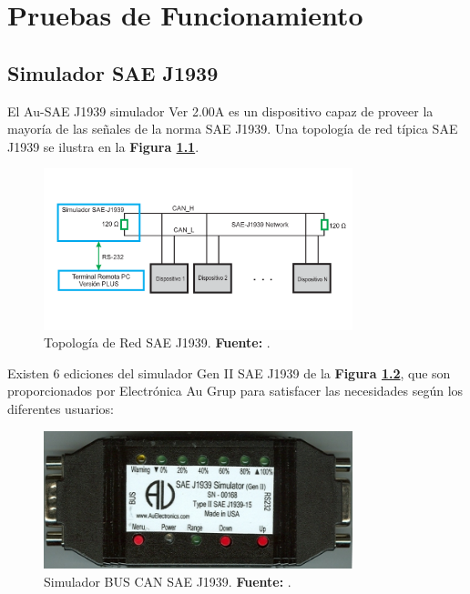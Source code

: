 \chapter[Capítulo 6. Pruebas de Funcionamiento]{Pruebas de Funcionamiento}

\section{Simulador SAE J1939}

El Au-SAE J1939 simulador Ver 2.00A es un dispositivo capaz de proveer la mayoría de las señales de la norma SAE J1939. Una topología de red típica SAE J1939 se ilustra en la \textbf{Figura \ref{TPSAE}}.

\begin{figure}[H]
	\centering
		\includegraphics[width=0.8\textwidth]{./Cap6imagen/EjemploSimulador.pdf}
	\caption[Topología de Red SAE J1939.]{Topología de Red SAE J1939.\textbf{ Fuente:} \cite{UserM}.}
	\label{TPSAE} %
\end{figure}

Existen 6 ediciones del simulador  Gen II SAE J1939 de la \textbf{Figura \ref{Sim}}, que son proporcionados por Electrónica Au Grup para satisfacer las necesidades según los diferentes usuarios: 

\begin{figure}[H]
	\centering
		\includegraphics[width=0.8\textwidth]{./Cap6imagen/Simulador.png}
	\caption[Simulador BUS CAN SAE J1939.]{Simulador BUS CAN SAE J1939.\textbf{ Fuente:} \cite{UserM}.}
	\label{Sim} %
\end{figure}


